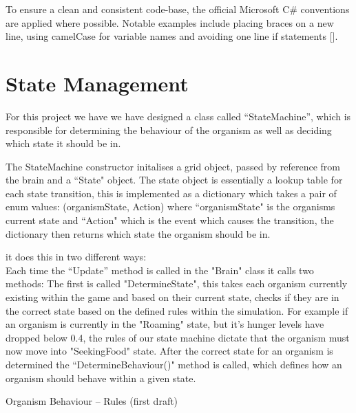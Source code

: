 \documentclass[a4paper, oneside, 11pt]{report}
\begin{document}
To ensure a clean and consistent code-base, the official Microsoft C\# conventions are applied where possible. Notable examples include placing braces on a new line, using camelCase for variable names and avoiding one line if statements [\cite{microsoft}].


\section{State Management}\label{statemanagement}
For this project we have we have designed a class called ``StateMachine'', which is responsible for determining the behaviour of the organism as well as deciding which state it should be in.

The StateMachine constructor initalises a grid object, passed by reference from the brain and a ``State" object. The state object is essentially a lookup table for each state transition, this is implemented as a dictionary which takes a pair of enum values: (organismState, Action) where ``organismState" is the organisms current state and ``Action" which is the event which causes the transition, the dictionary then returns which state the organism should be in.

 it does this in two different ways: \\

Each time the ``Update'' method is called in the "Brain" class it calls two methods:
The first is called "DetermineState", this takes each organism currently existing within the game and based on their current state, checks if they are in the  correct state based on the defined rules within the simulation. For example if an organism is currently in the "Roaming" state, but it's hunger levels have dropped below 0.4, the rules of our state machine dictate that the organism must now move into "SeekingFood" state. After the correct state for an organism is determined the ``DetermineBehaviour()" method is called, which defines how an organism should behave within a given state.

Organism Behaviour – Rules (first draft)
\end{document}
